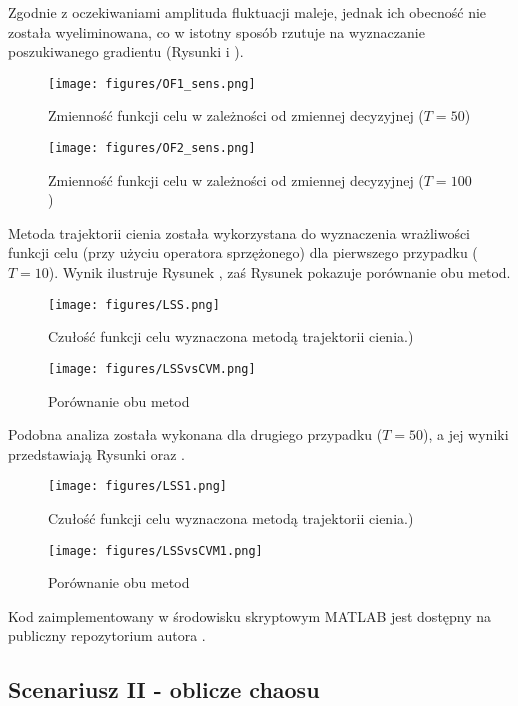 \documentclass[12pt]{article}
\begin{document}
Zgodnie z oczekiwaniami amplituda fluktuacji maleje, jednak ich obecność nie została wyeliminowana, co w istotny sposób rzutuje na wyznaczanie poszukiwanego gradientu (Rysunki  i ).
\begin{figure}[H]
	\texttt{[image: figures/OF1\_sens.png]} 
	\centering
	\caption{Zmienność funkcji celu w zależności od zmiennej decyzyjnej ($ T=50 $)}
\end{figure}
\begin{figure}[H]
	\texttt{[image: figures/OF2\_sens.png]} 
	\centering
	\caption{Zmienność funkcji celu w zależności od zmiennej decyzyjnej ($ T=100 $)}
\end{figure}
Metoda trajektorii cienia została wykorzystana do wyznaczenia wrażliwości funkcji celu (przy użyciu operatora sprzężonego) dla pierwszego przypadku ($ T=10 $). Wynik ilustruje Rysunek , zaś Rysunek  pokazuje porównanie obu metod.
\begin{figure}[H]
	\texttt{[image: figures/LSS.png]} 
	\centering
	\caption{Czułość funkcji celu wyznaczona metodą trajektorii cienia.)}
\end{figure}
\begin{figure}[H]
	\texttt{[image: figures/LSSvsCVM.png]} 
	\centering
	\caption{Porównanie obu metod}
\end{figure}
Podobna analiza została wykonana dla drugiego przypadku ($ T=50 $), a jej wyniki przedstawiają Rysunki  oraz .
\begin{figure}[H]
	\texttt{[image: figures/LSS1.png]} 
	\centering
	\caption{Czułość funkcji celu wyznaczona metodą trajektorii cienia.)}
\end{figure}
\begin{figure}[H]
	\texttt{[image: figures/LSSvsCVM1.png]} 
	\centering
	\caption{Porównanie obu metod}
\end{figure}
Kod zaimplementowany w środowisku skryptowym MATLAB jest dostępny na publiczny repozytorium autora \cite{Marek1}.
\subsection{Scenariusz II - oblicze chaosu}
\end{document}
